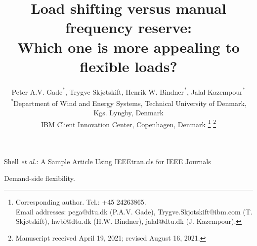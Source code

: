 \documentclass[lettersize,journal]{IEEEtran}
\begin{document}
\title{Load shifting versus manual frequency reserve: \\ Which one is more appealing to flexible loads?}

\author{Peter A.V. Gade\textsuperscript{*}\textsuperscript{\textdagger}, Trygve Skjøtskift\textsuperscript{\textdagger}, Henrik W. Bindner\textsuperscript{*}, Jalal Kazempour\textsuperscript{*} \\
    \textsuperscript{*}Department of Wind and Energy Systems, Technical University of Denmark, Kgs. Lyngby, Denmark \\
    \textsuperscript{\textdagger}IBM Client Innovation Center, Copenhagen, Denmark
    \thanks{Corresponding author. Tel.: +45 24263865. \\ Email addresses: pega@dtu.dk (P.A.V. Gade), Trygve.Skjotskift@ibm.com (T. Skjøtskift), hwbi@dtu.dk (H.W. Bindner), jalal@dtu.dk (J. Kazempour).}%
    \thanks{Manuscript received April 19, 2021; revised August 16, 2021.}}


%
{Shell \MakeLowercase{\textit{et al.}}: A Sample Article Using IEEEtran.cls for IEEE Journals}


\maketitle


\begin{abstract}
    
\end{abstract}

\begin{IEEEkeywords}
    Demand-side flexibility.
\end{IEEEkeywords}







\end{document}
